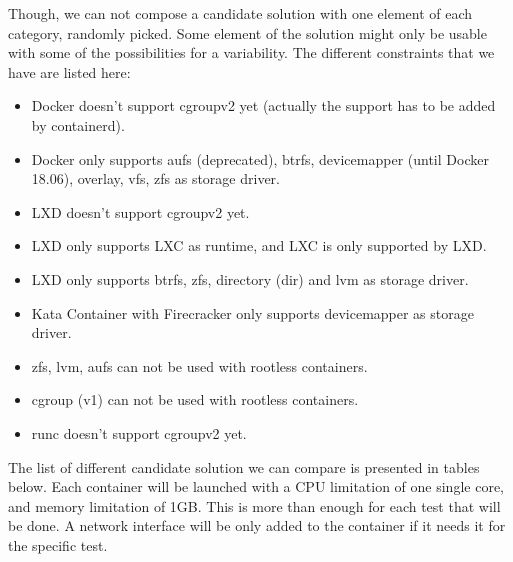 Though, we can not compose a candidate solution with one element of each category, randomly picked.  Some element of the solution might only be usable with some of the possibilities for a variability.  The different constraints that we have are listed here:
\begin{itemize}
  \renewcommand\labelitemi{--}
  \item Docker doesn't support cgroupv2 yet (actually the support has to be added by containerd).
  \item Docker only supports aufs (deprecated), btrfs, devicemapper (until Docker 18.06), overlay, vfs, zfs as storage driver.
  \item LXD doesn't support cgroupv2 yet.
  \item LXD only supports LXC as runtime, and LXC is only supported by LXD.
  \item LXD only supports btrfs, zfs, directory (dir) and lvm as storage driver.
  \item Kata Container with Firecracker only supports devicemapper as storage driver.
  \item zfs, lvm, aufs can not be used with rootless containers.
  \item cgroup (v1) can not be used with rootless containers.
  \item runc doesn't support cgroupv2 yet.
\end{itemize}

The list of different candidate solution we can compare is presented in tables below.  Each container will be launched with a CPU limitation of one single core, and memory limitation of 1GB.  This is more than enough for each test that will be done.  A network interface will be only added to the container if it needs it for the specific test.\\\\

